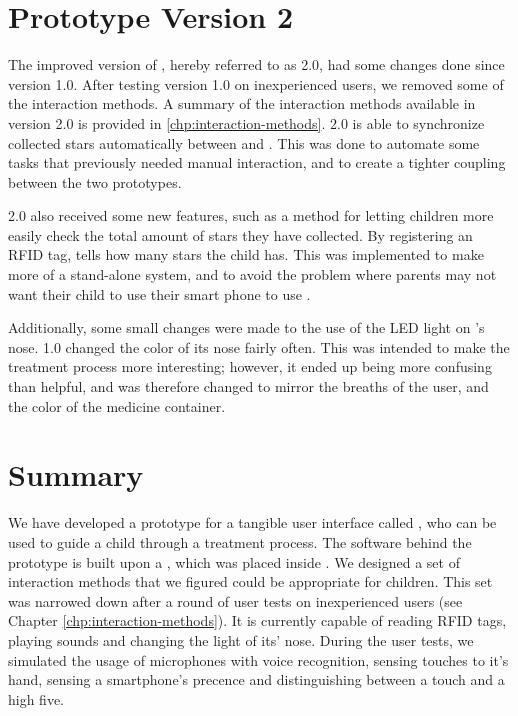 \section{Prototype Version 2}
\label{sec:abversion2}
The improved version of \ab{}, hereby referred to as \ab{} 2.0, had some changes done since version 1.0. After testing version 1.0 on inexperienced users, we removed some of the interaction methods. A summary of the interaction methods available in version 2.0 is provided in \ref{chp:interaction-methods}. \ab{} 2.0 is able to synchronize collected stars automatically between \app{} and \ab{}. This was done to automate some tasks that previously needed manual interaction, and to create a tighter coupling between the two prototypes.

\ab{} 2.0 also received some new features, such as a method for letting children more easily check the total amount of stars they have collected. By registering an RFID tag, \ab{} tells how many stars the child has. This was implemented to make \ab{} more of a stand-alone system, and to avoid the problem where parents may not want their child to use their smart phone to use \app{}. 
 
Additionally, some small changes were made to the use of the LED light on \ab{}'s nose. \ab{} 1.0 changed the color of its nose fairly often. This was intended to make the treatment process more interesting; however, it ended up being more confusing than helpful, and was therefore changed to mirror the breaths of the user, and the color of the medicine container. 

\section{Summary}
\label{sec:asthmabuddysummary}
We have developed a prototype for a tangible user interface called \ab{}, who can be used to guide a child through a treatment process. The software behind the prototype is built upon a \rpi{}, which was placed inside \ab{}. We designed a set of interaction methods that we figured could be appropriate for children. This set was narrowed down after a round of user tests on inexperienced users (see Chapter \ref{chp:interaction-methods}). It is currently capable of reading RFID tags, playing sounds and changing the light of its' nose. During the user tests, we simulated the usage of microphones with voice recognition, sensing touches to it's hand, sensing a smartphone's precence and distinguishing between a touch and a high five.       